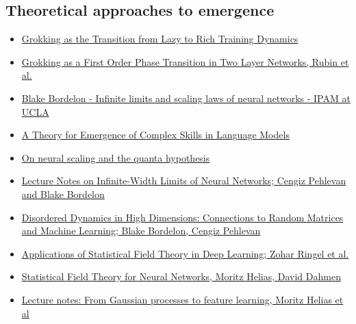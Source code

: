 \documentclass[11pt]{article}
\begin{document}
\subsection*{Theoretical approaches to emergence}
\begin{itemize}
  \item \href{https://arxiv.org/abs/2310.06110}{Grokking as the Transition from Lazy to Rich Training Dynamics}
  \item \href{https://arxiv.org/abs/2310.03789}{Grokking as a First Order Phase Transition in Two Layer Networks, Rubin et al.}
  \item \href{https://www.youtube.com/watch?v=WcWFFiPRslM&t=1056s}{Blake Bordelon - Infinite limits and scaling laws of neural networks - IPAM at UCLA}
  \item \href{https://arxiv.org/abs/2307.15936}{A Theory for Emergence of Complex Skills in Language Models}
  \item \href{https://ericjmichaud.com/quanta/}{On neural scaling and the quanta hypothesis}
  \item \href{https://pehlevan.seas.harvard.edu/sites/g/files/omnuum6471/files/pehlevan/files/princeton_lecture_notes.pdf}{Lecture Notes on Infinite-Width Limits of Neural Networks; Cengiz Pehlevan and Blake Bordelon}
  \item \href{https://arxiv.org/abs/2601.01010}{Disordered Dynamics in High Dimensions: Connections to Random Matrices and Machine Learning; Blake Bordelon, Cengiz Pehlevan}
  \item \href{https://arxiv.org/abs/2502.18553}{Applications of Statistical Field Theory in Deep Learning; Zohar Ringel et al.}
  \item \href{https://link.springer.com/book/10.1007/978-3-030-46444-8}{Statistical Field Theory for Neural Networks, Moritz Helias, David Dahmen}
  \item \href{https://arxiv.org/abs/2602.12855}{Lecture notes: From Gaussian processes to feature learning, Moritz Helias et al}
\end{itemize}




\end{document}
